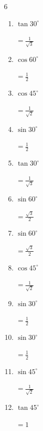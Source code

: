 \newpage
\resetdrill

\begin{multicols}{6}
\begin{enumerate}
  \itemsep=7pt
  \item $\displaystyle \tan{30^\circ}$

        $\displaystyle =\frac{1}{\sqrt{3}}$

  \item $\displaystyle \cos{60^\circ}$

        $\displaystyle =\frac{1}{2}$

  \item $\displaystyle \cos{45^\circ}$

        $\displaystyle =\frac{1}{\sqrt{2}}$

  \item $\displaystyle \sin{30^\circ}$

        $\displaystyle =\frac{1}{2}$

  \item $\displaystyle \tan{30^\circ}$

        $\displaystyle =\frac{1}{\sqrt{3}}$

  \item $\displaystyle \sin{60^\circ}$

        $\displaystyle =\frac{\sqrt{3}}{2}$

  \item $\displaystyle \sin{60^\circ}$

        $\displaystyle =\frac{\sqrt{3}}{2}$

  \item $\displaystyle \cos{45^\circ}$

        $\displaystyle =\frac{1}{\sqrt{2}}$

  \item $\displaystyle \sin{30^\circ}$

        $\displaystyle =\frac{1}{2}$

  \item $\displaystyle \sin{30^\circ}$

        $\displaystyle =\frac{1}{2}$

  \item $\displaystyle \sin{45^\circ}$

        $\displaystyle =\frac{1}{\sqrt{2}}$

  \item $\displaystyle \tan{45^\circ}$

        $\displaystyle =1$


\end{enumerate}
\end{multicols}
